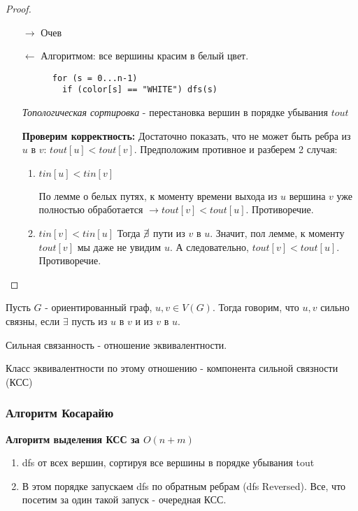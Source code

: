 \begin{proof}

\text{}

  \begin{enumerate}
    \item[$\rightarrow$] Очев
    \item[$\leftarrow$] Алгоритмом:
    все вершины красим в белый цвет.
    \begin{verbatim}
      for (s = 0...n-1)
        if (color[s] == "WHITE") dfs(s)
    \end{verbatim}  
    \textit{Топологическая сортировка} - перестановка вершин в порядке убывания $tout$

  \textbf{Проверим корректность:} Достаточно показать, что не может быть ребра из $u$ в $v$: $tout[u] < tout[v]$. Предположим противное и разберем 2 случая:
    \begin{enumerate}
      \item $tin[u] < tin[v]$
   
   По лемме о белых путях, к моменту времени выхода из $u$ вершина $v$ уже полностью обработается $\rightarrow tout[v] < tout[u]$. Противоречие.
  \item $tin[v] < tin[u]$
  Тогда $\cancel \exists$ пути из $v$ в $u$. Значит, пол лемме, к моменту $tout[v]$ мы даже не увидим $u$. А следовательно, $tout[v] < tout[u]$. Противоречие.
\end{enumerate}
  \end{enumerate}
\end{proof}

\begin{definition}
  Пусть $G$ - ориентированный граф, $u, v \in V(G)$. Тогда говорим, что $u, v$ сильно связны, если $\exists$ пусть из $u$ в $v$ и из $v$ в $u$.
\end{definition}

\begin{problem}
Сильная связанность - отношение эквивалентности.
\end{problem}
\begin{definition}
  Класс эквивалентности по этому отношению - компонента сильной связности (КСС)
\end{definition}

\newpage
\subsubsection{Алгоритм Косарайю}
\textbf{Алгоритм выделения КСС за $O(n + m)$}

\begin{enumerate}
  \item dfs от всех вершин, сортируя все вершины в порядке убывания tout
  \item В этом порядке запускаем dfs по обратным ребрам (dfs Reversed). Все, что посетим за один такой запуск - очередная КСС. 
\end{enumerate}

